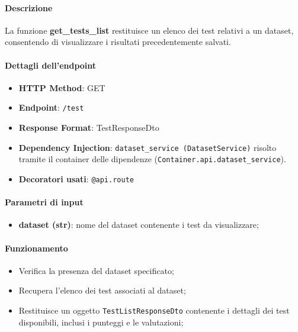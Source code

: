\paragraph{Descrizione}
La funzione \textbf{get\_tests\_list} restituisce un elenco dei test relativi a un dataset, consentendo di visualizzare i risultati precedentemente salvati.

\paragraph{Dettagli dell'endpoint}
\begin{itemize}
    \item \textbf{HTTP Method}: GET
    \item \textbf{Endpoint}: \texttt{/test}
    \item \textbf{Response Format}: TestResponseDto
    \item \textbf{Dependency Injection}: \texttt{dataset\_service (DatasetService)} risolto tramite il container delle dipendenze (\texttt{Container.api.dataset\_service}).
    \item \textbf{Decoratori usati}: \texttt{@api.route}
\end{itemize}

\paragraph{Parametri di input}
\begin{itemize}
    \item \textbf{dataset (str)}: nome del dataset contenente i test da visualizzare;
\end{itemize}

\paragraph{Funzionamento}
\begin{itemize}
    \item Verifica la presenza del dataset specificato;
    \item Recupera l'elenco dei test associati al dataset;
    \item Restituisce un oggetto \texttt{TestListResponseDto} contenente i dettagli dei test disponibili, inclusi i punteggi e le valutazioni;
\end{itemize}

